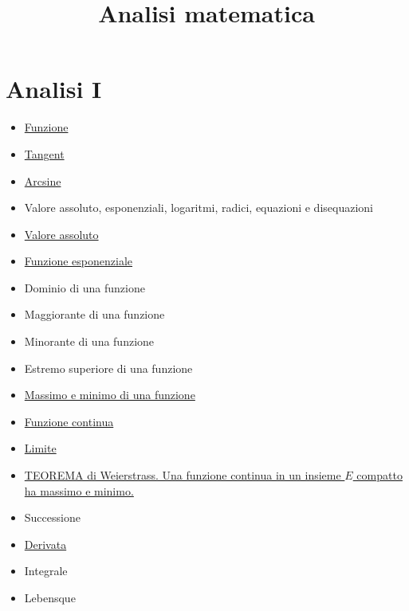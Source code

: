 \documentclass[a4paper,10pt]{article}
\title{Analisi matematica}
\author{}
\begin{document}
\maketitle

\section{Analisi I}
\begin{itemize}
 \item \href{Function.html}{Funzione}
 \item \href{Tangent.html}{Tangent}
 \item \href{Arcsine.html}{Arcsine}
 \item Valore assoluto, esponenziali, logaritmi, radici, equazioni e disequazioni
 \item \href{./ValoreAssoluto.html}{Valore assoluto}
 \item \href{./FunzioneEsponenziale.html}{Funzione esponenziale}
 \item Dominio di una funzione
 \item Maggiorante di una funzione
 \item Minorante di una funzione
 \item Estremo superiore di una funzione
 \item \href{FunzioneMassimoMinimo.html}{Massimo e minimo di una funzione}
 \item \href{FunzioneContinua.html}{Funzione continua}
 \item \href{Limite.html}{Limite}
 \item \href{Weierstrass.html}{TEOREMA di Weierstrass. Una funzione continua in un insieme $E$ compatto ha massimo e minimo.}
 \item Successione
 \item \href{Derivata.html}{Derivata} 
 \item Integrale
 \item Lebensque
\end{itemize}
\end{document}
